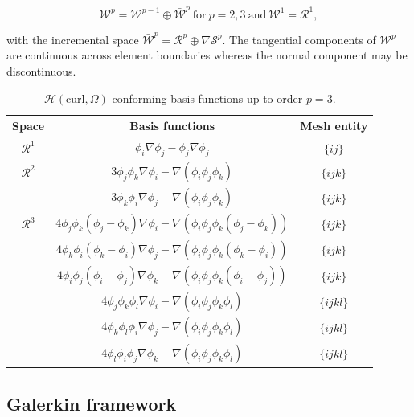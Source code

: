 $$\mathcal{W}^p = \mathcal{W}^{p-1} \oplus \bar{\mathcal{W}}^{p} \ \mathrm{for} \ p = 2, 3 \ \mathrm{and} \ \mathcal{W}^{1}= \mathcal{R}^{1},$$

\noindent with the incremental space $\bar{\mathcal{W}}^p = \mathcal{R}^p \oplus \nabla \mathcal{S}^p$. The tangential components of $\mathcal{W}^p$ are continuous across element boundaries whereas the normal component may be discontinuous.

\begin{table}[h!]
\begin{center}
\begin{tabular}{|c|c|c|}
\hline 
Space & Basis functions & Mesh entity \\
\hline
\hline 
$\mathcal{R}^1$ & $\phi_i\nabla\phi_j-\phi_j\nabla\phi_j$ & $\lbrace ij \rbrace$ \\
\hline 
$\mathcal{R}^2$ & $3\phi_j\phi_k\nabla\phi_i-\nabla(\phi_i\phi_j\phi_k)$ & $\lbrace ijk \rbrace$ \\
 & $3\phi_k\phi_i\nabla\phi_j-\nabla(\phi_i\phi_j\phi_k)$ & $\lbrace ijk \rbrace$ \\
\hline 
$\mathcal{R}^3$ & $4\phi_j\phi_k(\phi_j - \phi_k)\nabla\phi_i - \nabla\left(\phi_i\phi_j\phi_k(\phi_j-\phi_k)\right)$ & $\lbrace ijk \rbrace$ \\
 & $4\phi_k\phi_i(\phi_k - \phi_i)\nabla\phi_j - \nabla\left(\phi_i\phi_j\phi_k(\phi_k-\phi_i)\right)$ & $\lbrace ijk \rbrace$ \\
 & $4\phi_i\phi_j(\phi_i - \phi_j)\nabla\phi_k - \nabla\left(\phi_i\phi_j\phi_k(\phi_i-\phi_j)\right)$ & $\lbrace ijk \rbrace$ \\
 & $4\phi_j\phi_k\phi_l\nabla\phi_i - \nabla(\phi_i\phi_j\phi_k\phi_l)$ & $\lbrace ijkl \rbrace$ \\ 
 & $4\phi_k\phi_l\phi_i\nabla\phi_j - \nabla(\phi_i\phi_j\phi_k\phi_l)$ & $\lbrace ijkl \rbrace$ \\ 
 & $4\phi_l\phi_i\phi_j\nabla\phi_k - \nabla(\phi_i\phi_j\phi_k\phi_l)$ & $\lbrace ijkl \rbrace$ \\ 
\hline 
\end{tabular} 
\end{center}
\caption{$\mathcal{H}(\mathrm{curl},\Omega)$-conforming basis functions up to order $p = 3$.}
\label{tab:Hcurlfunctions}
\end{table}

\subsection{Galerkin framework}

